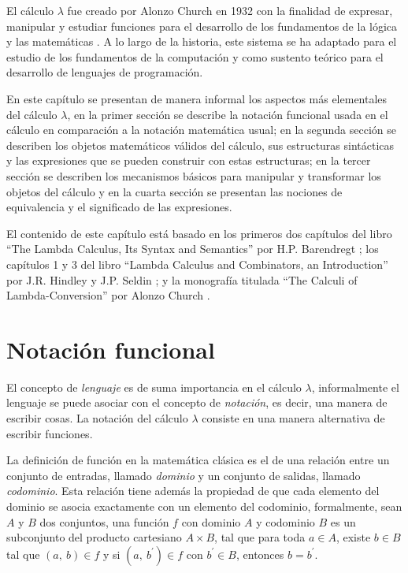 El cálculo \( λ \) fue creado por Alonzo Church en 1932 con la finalidad de expresar, manipular y estudiar funciones para el desarrollo de los fundamentos de la lógica y las matemáticas \cite{Church:FoundationsLogic}. A lo largo de la historia, este sistema se ha adaptado para el estudio de los fundamentos de la computación y como sustento teórico para el desarrollo de lenguajes de programación.

En este capítulo se presentan de manera informal los aspectos más elementales del cálculo \( λ \), en la primer sección se describe la notación funcional usada en el cálculo en comparación a la notación matemática usual; en la segunda sección se describen los objetos matemáticos válidos del cálculo, sus estructuras sintácticas y las expresiones que se pueden construir con estas estructuras; en la tercer sección se describen los mecanismos básicos para manipular y transformar los objetos del cálculo y en la cuarta sección se presentan las nociones de equivalencia y el significado de las expresiones.

El contenido de este capítulo está basado en los primeros dos capítulos del libro ``The Lambda Calculus, Its Syntax and Semantics'' por H.P. Barendregt \cite{Barendregt:Bible}; los capítulos 1 y 3 del libro ``Lambda Calculus and Combinators, an Introduction'' por J.R. Hindley y J.P. Seldin \cite{HindleySeldin:LambdaCalculusAndCombinators}; y la monografía titulada ``The Calculi of Lambda-Conversion'' por Alonzo Church \cite{Church:LambdaConversion}.

\section{Notación funcional}
\label{sec:notacion-funcional}

El concepto de \emph{lenguaje} es de suma importancia en el cálculo \( λ \), informalmente el lenguaje se puede asociar con el concepto de \emph{notación}, es decir, una manera de escribir cosas. La notación del cálculo \( λ \) consiste en una manera alternativa de escribir funciones.

La definición de función en la matemática clásica es el de una relación entre un conjunto de entradas, llamado \emph{dominio} y un conjunto de salidas, llamado \emph{codominio}. Esta relación tiene además la propiedad de que cada elemento del dominio se asocia exactamente con un elemento del codominio, formalmente, sean \( A \) y \( B \) dos conjuntos, una función \( f \) con dominio \( A \) y codominio \( B \) es un subconjunto del producto cartesiano \( A \times B \), tal que para toda \( a \in A \), existe \( b \in B \) tal que \( (a,\ b) \in f \) y si \( (a,\ b^{\prime}) \in f \) con \( b^{\prime} \in B \), entonces \( b=b^{\prime} \).

